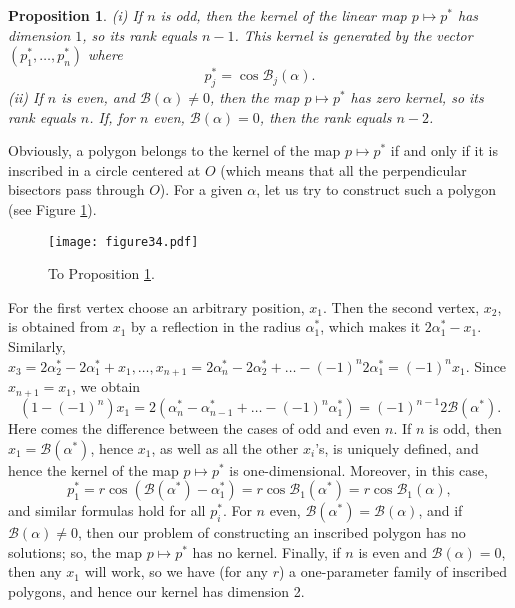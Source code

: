 \documentclass[12pt]{article}
\makeatletter
\newtheorem{proposition}[lemma]{Proposition}
\renewenvironment{proof}[1][\proofname] 
{\par\pushQED{\qed}\normalfont\topsep6\p@\@plus6\p@\relax\trivlist\item[\hskip\labelsep\bfseries#1\@addpunct{.}]\ignorespaces}{\popQED\endtrivlist\@endpefalse}
\newcommand{\B}{\mathcal{B}}
\makeatother
\begin{document}
\begin{proposition}\label{KernelRank}
{\rm(i)} If $n$ is odd, then the kernel of the linear map $p\mapsto p^\ast$ has dimension $1$, so its rank equals $n-1$. This kernel is generated by the vector $(p_1^\ast,\dots,p_n^\ast)$ where $$p_j^\ast=\cos\B_j(\alpha).$$
{\rm(ii)} If $n$ is even, and $\B(\alpha)\ne0$, then the map $p\mapsto p^\ast$ has zero kernel, so its rank equals $n$. If, for $n$ even, $\B(\alpha)=0$, then the rank equals $n-2$.
\end{proposition}
\begin{proof}
Obviously, a polygon belongs to the kernel of the map $p\mapsto p^\ast$ if and only if it is inscribed in a circle centered at $O$ (which means that all the perpendicular bisectors pass through $O$). For a given $\alpha$, let us try to construct such a polygon (see Figure \ref{inscribed}).

\begin{figure} [htbp]
\centering
\texttt{[image: figure34.pdf]}
\caption{To Proposition \ref{KernelRank}.}
\label{inscribed}
\end{figure}

For the first vertex choose an arbitrary position, $x_1$. Then the second vertex, $x_2$, is obtained from $x_1$ by a reflection in the radius $\alpha_1^\ast$, which makes it $2\alpha_1^\ast-x_1$. Similarly, $x_3=2\alpha_2^\ast-2\alpha_1^\ast+x_1,\dots,x_{n+1}=2\alpha^\ast_n-2\alpha^\ast_2+\dots-(-1)^n2\alpha^\ast_1=(-1)^nx_1.$ Since $x_{n+1}=x_1$, we obtain $$(1-(-1)^n)x_1=2(\alpha^\ast_n-\alpha^\ast_{n-1}+\dots-(-1)^n\alpha_1^\ast)=(-1)^{n-1}2\B(\alpha^\ast).$$Here comes the difference between the cases of odd and even $n$. If $n$ is odd, then $x_1=\B(\alpha^\ast)$, hence $x_1$, as well as all the other $x_i$'s, is uniquely defined, and hence the kernel of the map $p\mapsto p^\ast$ is one-dimensional. Moreover, in this case,$$p_1^\ast=r\cos(\B(\alpha^\ast)-\alpha^\ast_1)=r\cos\B_1(\alpha^\ast)=r\cos\B_1(\alpha),$$and similar formulas hold for all $p^\ast_i$. For $n$ even, $\B(\alpha^\ast)=\B(\alpha)$, and if $\B(\alpha)\ne0$, then our problem of constructing an inscribed polygon has no solutions; so, the map $p\mapsto p^\ast$ has no kernel. Finally, if $n$ is even and $\B(\alpha)=0$, then any $x_1$ will work, so we have (for any $r$) a one-parameter family  of inscribed polygons, and hence our kernel has dimension 2.
\end{proof}
\end{document}

